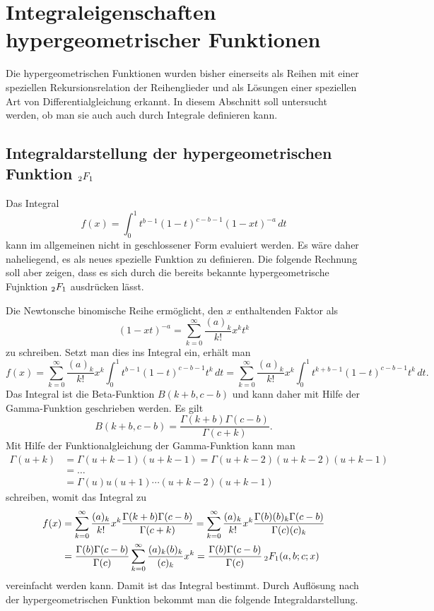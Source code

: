 %
%
%
\section{Integraleigenschaften hypergeometrischer Funktionen
\label{buch:integral:section:eulertransformation}}
Die hypergeometrischen Funktionen wurden bisher einerseits
als Reihen mit einer speziellen Rekursionsrelation der Reihenglieder
und als Lösungen einer speziellen Art von Differentialgleichung
erkannt.
In diesem Abschnitt soll untersucht werden, ob man sie auch
auch durch Integrale definieren kann.

%
%
\subsection{Integraldarstellung der hypergeometrischen Funktion
$\mathstrut_2F_1$}
Das Integral
\[
f(x)
=
\int_0^1 t^{b-1} (1-t)^{c-b-1} (1-xt)^{-a}\,dt
\]
kann im allgemeinen nicht in geschlossener Form evaluiert werden.
Es wäre daher naheliegend, es als neues spezielle Funktion zu definieren.
Die folgende Rechnung soll aber zeigen, dass es sich durch die bereits
bekannte hypergeometrische Fujnktion $\mathstrut_2F_1$ ausdrücken
lässt.

Die Newtonsche binomische Reihe ermöglicht, den $x$ enthaltenden
Faktor als
\[
(1-xt)^{-a}
=
\sum_{k=0}^\infty
\frac{(a)_k}{k!} x^k t^k
\]
zu schreiben.
Setzt man dies ins Integral ein, erhält man
\[
f(x)
=
\sum_{k=0}^\infty \frac{(a)_k}{k!} x^k
\int_0^1 t^{b-1} (1-t)^{c-b-1} t^k\,dt
=
\sum_{k=0}^\infty \frac{(a)_k}{k!} x^k
\int_0^1 t^{k+b-1} (1-t)^{c-b-1} t^k\,dt.
\]
Das Integral ist die Beta-Funktion $B(k+b,c-b)$ und kann daher mit Hilfe
der Gamma-Funktion geschrieben werden.
Es gilt
\[
B(k+b,c-b)
=
\frac{\Gamma(k+b)\Gamma(c-b)}{\Gamma(c+k)}.
\]
Mit Hilfe der Funktionalgleichung der Gamma-Funktion kann man
\begin{align*}
\Gamma(u+k)
&=
\Gamma(u+k-1) (u+k-1)
=
\Gamma(u+k-2) (u+k-2)(u+k-1)
\\
&=
\ldots
\\
&=
\Gamma(u) u(u+1)\cdots(u+k-2)(u+k-1)
\end{align*}
schreiben, womit das Integral zu
\begin{align*}
f(x)
&=
\sum_{k=0}^\infty \frac{(a)_k}{k!} x^k
\frac{\Gamma(k+b)\Gamma(c-b)}{\Gamma(c+k)}
=
\sum_{k=0}^\infty \frac{(a)_k}{k!} x^k
\frac{\Gamma(b)(b)_k\Gamma(c-b)}{\Gamma(c)(c)_k}
\\
&=
\frac{\Gamma(b)\Gamma(c-b)}{\Gamma(c)}
\sum_{k=0}^\infty\frac{(a)_k(b)_k}{(c)_k} x^k
=
\frac{\Gamma(b)\Gamma(c-b)}{\Gamma(c)}\,\mathstrut_2F_1(a,b;c;x)
\end{align*}
vereinfacht werden kann.
Damit ist das Integral bestimmt. 
Durch Auflösung nach der hypergeometrischen Funktion bekommt man
die folgende Integraldarstellung.

